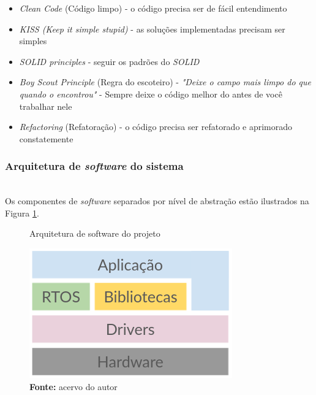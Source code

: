 \documentclass[times, twoside, watermark]{artigo}
\begin{document}
\begin{itemize}
  \item \textit{Clean Code} (Código limpo) - o código precisa ser de fácil
        entendimento\cite{martin2009clean}
  \item \textit{KISS (Keep it simple stupid)} - as soluções implementadas precisam ser
        simples\cite{martin2018clean}
  \item \textit{SOLID principles} - seguir os padrões do \textit{SOLID}
        \cite{martin2002agile}
  \item \textit{Boy Scout Principle} (Regra do escoteiro) - \textit{"Deixe o campo mais
          limpo do que quando o encontrou"} - Sempre deixe o código melhor do antes de você
        trabalhar nele\cite{martin2009clean}
  \item \textit{Refactoring} (Refatoração) - o código precisa ser refatorado e
        aprimorado constatemente\cite{martin2009clean}
\end{itemize}

\subsubsection{Arquitetura de \textit{software} do sistema}\hfill\\

Os componentes de \textit{software} separados por nível de abstração estão ilustrados
na Figura \ref{fig:arch2}.\hfill\\

\begin{figure}[H]
  \centering
  \caption{Arquitetura de software do projeto}
  \includegraphics[width=0.9\linewidth]{images/arch2.png}
  \caption*{\newline\textbf{Fonte:} acervo do autor}
  \label{fig:arch2}
\end{figure}
\end{document}
